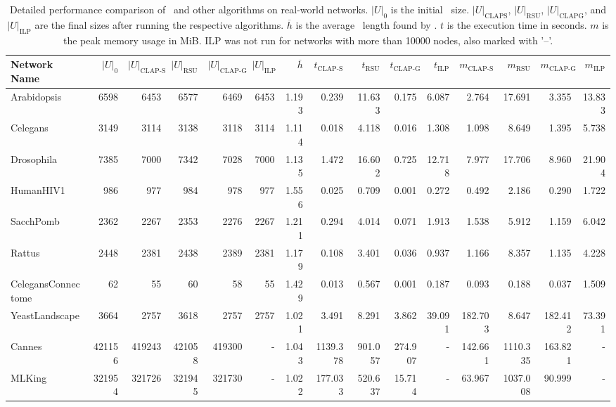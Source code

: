 \begin{table}[!htbp]
\caption{
    Detailed performance comparison of \algoCLAPS\ and other algorithms on real-world networks. 
    $|U|_0$ is the initial \UDSabbr\ size. 
    $|U|_{\text{CLAPS}}$, $|U|_{\text{RSU}}$, $|U|_{\text{CLAPG}}$, and $|U|_{\text{ILP}}$ are the final sizes after running the respective algorithms. 
    $\overline{h}$ is the average \CLAPabbr\ length found by \algoCLAPS.
    $t$ is the execution time in seconds. 
    $m$ is the peak memory usage in MiB.
    ILP was not run for networks with more than 10000 nodes, also marked with '--'.
}
\label{tab:real_networks_comparison}
\centering
\begin{tabular}{lrrrrrrrrrrrrrr}
\toprule
Network Name & $|U|_0$ & $|U|_{\text{CLAP-S}}$ & $|U|_{\text{RSU}}$ & $|U|_{\text{CLAP-G}}$ & $|U|_{\text{ILP}}$ & $\overline{h}$ & $t_{\text{CLAP-S}}$ & $t_{\text{RSU}}$ & $t_{\text{CLAP-G}}$ & $t_{\text{ILP}}$ & $m_{\text{CLAP-S}}$ & $m_{\text{RSU}}$ & $m_{\text{CLAP-G}}$ & $m_{\text{ILP}}$ \\
\midrule
Arabidopsis & 6598 & 6453 & 6577 & 6469 & 6453 & 1.193 & 0.239 & 11.633 & 0.175 & 6.087 & 2.764 & 17.691 & 3.355 & 13.833 \\
Celegans & 3149 & 3114 & 3138 & 3118 & 3114 & 1.114 & 0.018 & 4.118 & 0.016 & 1.308 & 1.098 & 8.649 & 1.395 & 5.738 \\
Drosophila & 7385 & 7000 & 7342 & 7028 & 7000 & 1.135 & 1.472 & 16.602 & 0.725 & 12.718 & 7.977 & 17.706 & 8.960 & 21.904 \\
HumanHIV1 & 986 & 977 & 984 & 978 & 977 & 1.556 & 0.025 & 0.709 & 0.001 & 0.272 & 0.492 & 2.186 & 0.290 & 1.722 \\
SacchPomb & 2362 & 2267 & 2353 & 2276 & 2267 & 1.211 & 0.294 & 4.014 & 0.071 & 1.913 & 1.538 & 5.912 & 1.159 & 6.042 \\
Rattus & 2448 & 2381 & 2438 & 2389 & 2381 & 1.179 & 0.108 & 3.401 & 0.036 & 0.937 & 1.166 & 8.357 & 1.135 & 4.228 \\
CelegansConnectome & 62 & 55 & 60 & 58 & 55 & 1.429 & 0.013 & 0.567 & 0.001 & 0.187 & 0.093 & 0.188 & 0.037 & 1.509 \\
YeastLandscape & 3664 & 2757 & 3618 & 2757 & 2757 & 1.021 & 3.491 & 8.291 & 3.862 & 39.091 & 182.703 & 8.647 & 182.412 & 73.391 \\
Cannes & 421156 & 419243 & 421058 & 419300 & - & 1.043 & 1139.378 & 901.057 & 274.907 & - & 142.661 & 1110.335 & 163.821 & - \\
MLKing & 321954 & 321726 & 321945 & 321730 & - & 1.022 & 177.033 & 520.637 & 15.714 & - & 63.967 & 1037.008 & 90.999 & - \\

\end{tabular}
\end{table}
